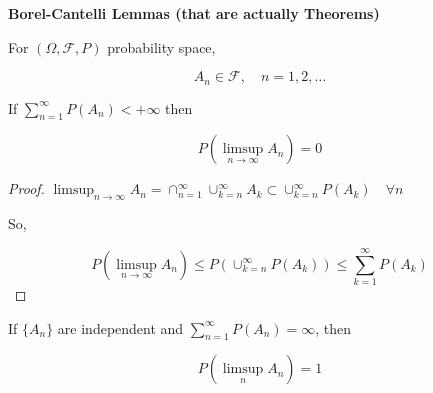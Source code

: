 \documentclass[11pt,fleqn]{book} %
\begin{document}
\textbf{Borel-Cantelli Lemmas (that are actually Theorems)}


\begin{theorem}[BC1]	
	For $(\Omega, \mathscr{F}, P)$ probability space, 

	$$A_n \in \mathscr{F}, \quad n= 1, 2, \dots$$

	If $\displaystyle \sum^\infty_{n=1} P(A_n) < + \infty$ then

	$$P(\limsup_{n \rightarrow \infty} A_n) = 0 $$
\end{theorem}	

\begin{proof}
	$\limsup_{n \rightarrow \infty} A_n = \cap^\infty_{n=1} \cup^\infty_{k=n} A_k \subset \cup^\infty_{k=n} P(A_k) \quad \forall n$

	So, 

	$$P(\limsup_{n \rightarrow \infty} A_n) \leq P( \cup^\infty_{k=n} P(A_k)) \leq \sum^\infty_{k=1} P(A_k)$$

\end{proof}

\begin{theorem}[BC2]
	If $\{A_n\}$ are independent and $\displaystyle \sum^\infty_{n=1} P(A_n) = \infty$, then

	$$P(\limsup_n A_n) = 1 $$
\end{theorem}
\end{document}
